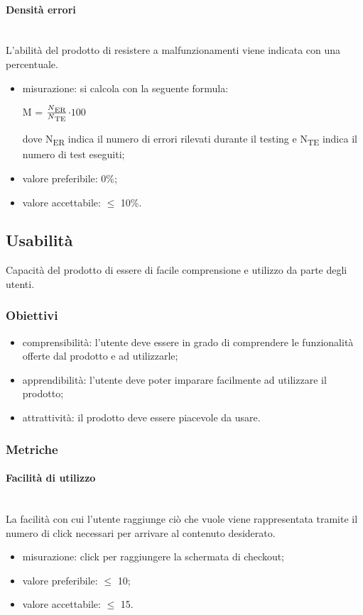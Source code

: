 			\paragraph{Densità errori}\mbox{}\\
			L'abilità del prodotto di resistere a malfunzionamenti viene indicata con una percentuale.
			\begin{itemize}
			\item misurazione: si calcola con la seguente formula: \\
			\centerline{ M =  \(\frac{N\textsubscript{ER}}{N\textsubscript{TE}} \)$ \cdot 100$ }
			dove N\textsubscript{ER} indica il numero di errori rilevati durante il testing e N\textsubscript{TE} indica il numero di test eseguiti;
			\item valore preferibile: 0\%;
			\item valore accettabile: $\leq$ 10\%.
			\end{itemize}
	\subsection{Usabilità}
	Capacità del prodotto di essere di facile comprensione e utilizzo da parte degli utenti.
		\subsubsection{Obiettivi}
		\begin{itemize}
			\item comprensibilità: l'utente deve essere in grado di comprendere le funzionalità offerte dal prodotto e ad utilizzarle;
			\item apprendibilità: l'utente deve poter imparare facilmente ad utilizzare il prodotto;
			\item attrattività: il prodotto deve essere piacevole da usare.
		\end{itemize}
		\subsubsection{Metriche}
			\paragraph{Facilità di utilizzo}\mbox{}\\
			La facilità con cui l'utente raggiunge ciò che vuole viene rappresentata tramite il numero di click necessari per arrivare al contenuto desiderato.
			\begin{itemize}
			\item misurazione: click per raggiungere la schermata di checkout;
			\item valore preferibile: $\leq$ 10;
			\item valore accettabile: $\leq$ 15.
			\end{itemize}
